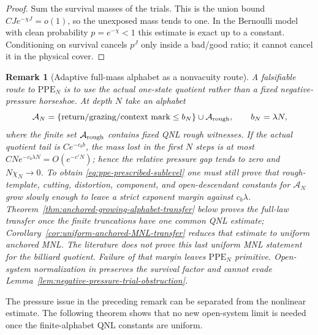 \documentclass[11pt]{article}
\newtheorem{remark}[theorem]{Remark}
\begin{document}
\begin{proof}
Sum the survival masses of the trials.  This is the union bound
$CJ e^{-\chi J}=o(1)$, so the unexposed mass tends to one.  In the Bernoulli
model with clean probability $p=e^{-\chi}<1$ this estimate is exact up to a
constant.  Conditioning on survival cancels $p^J$ only inside a bad/good
ratio; it cannot cancel it in the physical cover.
\end{proof}

\begin{remark}[Adaptive full-mass alphabet as a nonvacuity route]
\label{rem:high-pressure-clean-route}
A falsifiable route to $\mathrm{PPE}_{N}$ is to use the actual one-state
quotient rather than a fixed negative-pressure horseshoe.  At depth $N$ take
an alphabet
\[
 \mathcal A_N=\{\text{return/grazing/context mark}\le b_N\}
 \cup\mathcal A_{\rm rough},\qquad b_N=\lambda N,
\]
where the finite set $\mathcal A_{\rm rough}$ contains fixed QNL rough
witnesses.  If the actual quotient tail is $Ce^{-c_b b}$, the mass lost in
the first $N$ steps is at most
$CN e^{-c_b\lambda N}=O(e^{-c'N})$; hence the relative pressure gap tends to
zero and $N\chi_N\to0$.  To obtain \eqref{eq:ppe-prescribed-sublevel} one
must still prove that rough-template, cutting, distortion, component, and
open-descendant constants for $\mathcal A_N$ grow slowly enough to leave a
strict exponent margin against $c_b\lambda$.
Theorem~\ref{thm:anchored-growing-alphabet-transfer} below proves the
full-law transfer once the finite truncations have one common QNL estimate;
Corollary~\ref{cor:uniform-anchored-MNL-transfer} reduces that estimate to
uniform anchored MNL.  The literature does not prove this last uniform MNL
statement for the billiard quotient.  Failure of that margin leaves
$\mathrm{PPE}_{N}$ primitive.  Open-system normalization in
\cite{CanestrariHoles,DLreview} preserves the survival factor and cannot
evade Lemma~\ref{lem:negative-pressure-trial-obstruction}.
\end{remark}

The pressure issue in the preceding remark can be separated from the
nonlinear estimate.  The following theorem shows that no new open-system
limit is needed once the finite-alphabet QNL constants are uniform.
\end{document}
